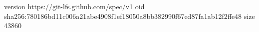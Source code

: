 version https://git-lfs.github.com/spec/v1
oid sha256:780186bd11c006a21abe4908f1ef18050a8bb382990f67ed87fa1ab12f2ffe48
size 43860
